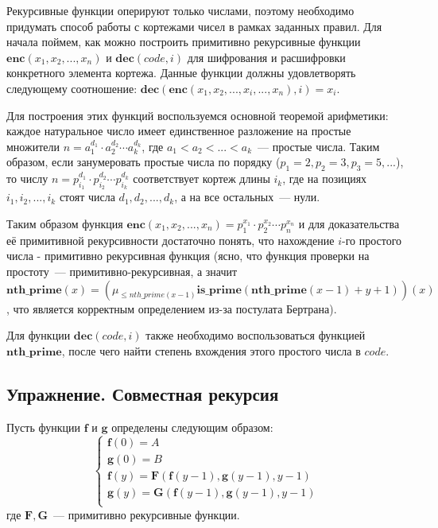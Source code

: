 \documentclass[
    11pt,
    a4paper
]{article}
\theoremstyle{definition}
\begin{document}
Рекурсивные функции оперируют только числами, поэтому необходимо придумать способ работы с кортежами чисел в рамках заданных правил. Для начала поймем, как можно построить примитивно рекурсивные функции $\mathbf{enc}(x_1, x_2, ..., x_n)$ и $\mathbf{dec}(code, i)$ для шифрования и расшифровки конкретного элемента кортежа.  Данные функции должны удовлетворять следующему соотношение: $\mathbf{dec}(\mathbf{enc}(x_1, x_2, ..., x_i, ..., x_n), i) = x_i$.

Для построения этих функций воспользуемся основной теоремой арифметики: каждое натуральное число имеет единственное разложение на простые множители $n = a_1^{d_1} \cdot a_2^{d_2} \cdots a_k^{d_k}$, где $a_1 < a_2 < ... < a_k$~--- простые числа. Таким образом, если занумеровать простые числа по порядку ($p_1 = 2, p_2 = 3, p_3 = 5, ...$), то числу $n = p_{i_1}^{d_1} \cdot p_{i_2}^{d_2} \cdots p_{i_k}^{d_k}$ соответствует кортеж длины $i_k$, где на позициях $i_1, i_2, ..., i_k$ стоят числа $d_1, d_2, ..., d_k$, а на все остальных~--- нули. 

Таким образом функция $\mathbf{enc}(x_1, x_2, ..., x_n) = p_1^{x_1} \cdot p_2^{x_2} \cdots p_n^{x_n}$ и для доказательства её примитивной рекурсивности достаточно понять, что нахождение $i$-го простого числа - примитивно рекурсивная функция (ясно, что функция проверки на простоту~--- примитивно-рекурсивная, а значит $\mathbf{nth\_prime}(x) = (\mu_{\leq nth\_prime(x-1)} \mathbf{is\_prime}(\mathbf{nth\_prime}(x - 1) + y + 1))(x)$, что является корректным определением из-за постулата Бертрана).

Для функции $\mathbf{dec}(code, i)$ также необходимо воспользоваться функцией $\mathbf{nth\_prime}$, после чего найти степень вхождения этого простого числа в $code$.

\subsection{Упражнение. Совместная рекурсия}

Пусть функции $\mathbf{f}$ и $\mathbf{g}$ определены следующим образом:
$$\begin{cases}
\mathbf{f}(0) = A\\
\mathbf{g}(0) = B\\
\mathbf{f}(y) = \mathbf{F}(\mathbf{f}(y - 1), \mathbf{g}(y - 1), y - 1)\\
\mathbf{g}(y) = \mathbf{G}(\mathbf{f}(y - 1), \mathbf{g}(y - 1), y - 1)\\
\end{cases}$$
где $\mathbf{F}, \mathbf{G}$~--- примитивно рекурсивные функции. 
\end{document}
